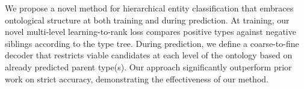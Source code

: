 We propose a novel method for hierarchical entity classification that  embraces ontological structure at both training and during prediction.  At training, our novel multi-level learning-to-rank loss compares positive types against negative siblings according to the type tree.  During prediction, we define a coarse-to-fine decoder that restricts viable candidates at each level of the ontology based on already predicted parent type(s). Our approach significantly outperform prior work on strict accuracy, demonstrating the effectiveness of our method.
